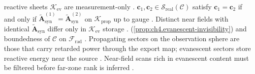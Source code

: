 reactive sheets \(\mathcal{K}_{\mathrm{ev}}\) are measurement-only \cite{devaney2004}.
\label{thm:ch4.prop-sector-equivalence}
\(\mathbf{c}_{1},\mathbf{c}_{2}\in\mathcal{S}_{\mathrm{real}}(\mathcal{C})\) satisfy \(\mathbf{c}_{1}=\mathbf{c}_{2}\) if and
only if \(\widetilde{\mathbf{A}}_{\mathrm{syn}}^{(1)}=\widetilde{\mathbf{A}}_{\mathrm{syn}}^{(2)}\) on
\(\mathcal{K}_{\mathrm{prop}}\) up to gauge \cite{stratton1941}. Distinct near fields with
identical \(\widetilde{\mathbf{A}}_{\mathrm{syn}}\) differ only in \(\mathcal{K}_{\mathrm{ev}}\) storage
\cite{harrington2001}.
(\ref{prop:ch4.evanescent-invisibility}) and boundedness of \(\mathcal{C}\) on
\(\mathcal{F}_{\mathrm{rad}}\) \cite{stratton1941}.
Propagating sectors on the observation sphere are those that carry retarded power through the export map; evanescent sectors store reactive energy near the source \cite{stratton1941}. Near-field scans rich in evanescent content must be filtered before far-zone rank is inferred \cite{devaney2004}.
